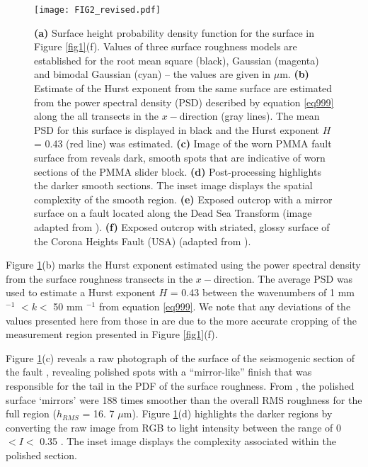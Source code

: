 \documentclass[preprint,1p, 10pt,authoryear]{elsarticle}
\begin{document}
\begin{figure}
	\centering
	\texttt{[image: FIG2\_revised.pdf]} 
	\caption{\textbf{(a)} Surface height probability density function for the surface  in Figure \ref{fig1}(f). Values of three surface roughness models are established for the root mean square (black), Gaussian (magenta) and bimodal Gaussian (cyan) -- the values are given in $\mu$m. \textbf{(b)} Estimate of the Hurst exponent from the same surface are estimated from the power spectral density (PSD) described by equation \eqref{eq999} along the all transects in the $x-$direction (gray lines). The mean PSD for this surface is displayed in black and the Hurst exponent $H$ = 0.43 (red line) was estimated. \textbf{(c)} Image of the worn PMMA fault surface from \citep{Selvadurai2015b} reveals dark, smooth spots that are indicative of worn sections of the PMMA slider block. \textbf{(d)} Post-processing highlights the darker smooth sections. The inset image displays the spatial complexity of the smooth region. \textbf{(e)} Exposed outcrop with a mirror surface on a fault located along the Dead Sea Transform (image adapted from \citet{Goldberg2016}).  \textbf{(f)} Exposed outcrop with striated, glossy surface of the Corona Heights Fault (USA) (adapted from \citet{Verberne2019}).}
	\label{fig2}
\end{figure}
Figure \ref{fig2}(b) marks the Hurst exponent estimated using the power spectral density from the surface roughness transects in the $x-$direction. The average PSD was used to estimate a Hurst exponent $H$ = 0.43 between the wavenumbers of 1 mm $^{-1}$  $<k<$  50 mm $^{-1}$ from equation \eqref{eq999}. We note that any deviations of the values presented here from those in \citet{Selvadurai2017} are due to the more accurate cropping of the measurement region presented in Figure \ref{fig1}(f). 

Figure \ref{fig2}(c) reveals a raw photograph of the surface of the seismogenic section of the fault \citep{Selvadurai2017}, revealing polished spots with a ``mirror-like'' finish that was responsible for the tail in the PDF of the surface roughness. From \citet{Selvadurai2017}, the polished surface `mirrors' were 188 times smoother than the overall RMS roughness for the full region ($h_{RMS}$ = 16. 7 $\mu$m). Figure \ref{fig2}(d) highlights the darker regions by converting the raw image from RGB to light intensity between the range of 0 $< I <$ 0.35 \citep{Gonzalez2009}. The inset image displays the complexity associated within the polished section.
\end{document}
